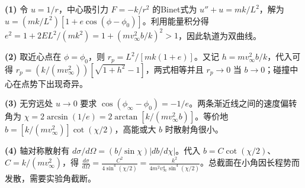 \par\noindent\textbf{(1)} 令 \(u=1/r\)，中心吸引力 \(F=-k/r^2\) 的Binet式为 \(u''+u=mk/L^2\)，解为 \(u=(mk/L^2)[1+e\cos(\phi-\phi_0)]\)。利用能量积分得 \(e^2=1+2EL^2/(mk^2)=1+(mv_\infty^2b/k)^2>1\)，因此轨道为双曲线。
\par\noindent\textbf{(2)} 取近心点在 \(\phi=\phi_0\)，则 \(r_p=L^2/[mk(1+e)]\)。又记 \(h=mv_\infty^2b/k\)，代入可得 \(r_p=(k/(mv_\infty^2))[\sqrt{1+h^2}-1]\)，两式相等并且 \(r_p\to0\) 当 \(b\to0\)；碰撞中心在点势下出现奇异。
\par\noindent\textbf{(3)} 无穷远处 \(u\to0\) 要求 \(\cos(\phi_\infty-\phi_0)=-1/e\)。两条渐近线之间的速度偏转角为 \(\chi=2\arcsin(1/e)=2\arctan[k/(mv_\infty^2b)]\)。等价地 \(b=[k/(mv_\infty^2)]\cot(\chi/2)\)，高能或大 \(b\) 时散射角很小。
\par\noindent\textbf{(4)} 轴对称散射有 \(d\sigma/d\Omega=(b/\sin\chi)|db/d\chi|\)。代入 \(b=C\cot(\chi/2)\)、\(C=k/(mv_\infty^2)\)，得 \(\frac{d\sigma}{d\Omega}=\frac{C^2}{4\sin^4(\chi/2)}=\frac{k^2}{4m^2v_\infty^4\sin^4(\chi/2)}\)。总截面在小角因长程势而发散，需要实验角截断。
